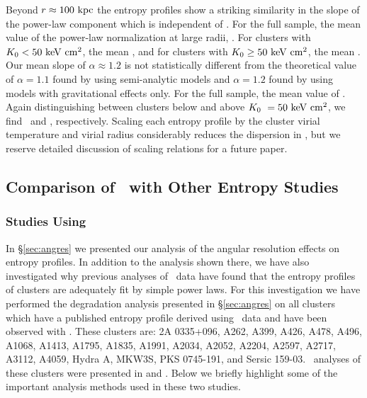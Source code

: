 \documentclass[12pt,preprint]{aastex}
\begin{document}
Beyond $r \approx 100 \mbox{\ensuremath{\mathrm{~kpc}}}$ the entropy profiles show a striking
similarity in the slope of the power-law component which is
independent of \kna. For the full sample, the mean value of the
power-law normalization at large radii, \alphafs. For clusters with
$K_0 < 50 \mathrm{\mbox{\ensuremath{\mathrm{~keV}}} \mathrm{\mbox{\ensuremath{\mathrm{~cm}}}^2}}$, the mean \alphaga, and for clusters with $K_0 \geq
50 \mathrm{\mbox{\ensuremath{\mathrm{~keV}}} \mathrm{\mbox{\ensuremath{\mathrm{~cm}}}^2}}$, the mean \alphagb. Our mean slope of $\alpha \approx 1.2$ is
not statistically different from the theoretical value of $\alpha =
1.1$ found by \citet{tozzi01} using semi-analytic models and $\alpha =
1.2$ found by \citet{vkb05} using models with gravitational effects
only. For the full sample, the mean value of \khunfs. Again
distinguishing between clusters below and above $K_0\ = 50 \mathrm{\mbox{\ensuremath{\mathrm{~keV}}} \mathrm{\mbox{\ensuremath{\mathrm{~cm}}}^2}}$, we
find \khunga\ and \khungb, respectively. Scaling each entropy profile
by the cluster virial temperature and virial radius considerably
reduces the dispersion in \khun, but we reserve detailed discussion of
scaling relations for a future paper.

\subsection{Comparison of \accept\ with Other Entropy Studies}
\label{sec:comp}

\subsubsection{Studies Using \xmm}

In \S \ref{sec:angres} we presented our analysis of the angular
resolution effects on entropy profiles. In addition to the analysis
shown there, we have also investigated why previous analyses of
\xmm\ data have found that the entropy profiles of clusters are
adequately fit by simple power laws. For this investigation we have
performed the degradation analysis presented in \S \ref{sec:angres} on
all clusters which have a published entropy profile derived using
\xmm\ data and have been observed with \chandra. These clusters are:
2A 0335+096, A262, A399, A426, A478, A496, A1068, A1413, A1795, A1835,
A1991, A2034, A2052, A2204, A2597, A2717, A3112, A4059, Hydra A,
MKW3S, PKS 0745-191, and Sersic 159-03. \xmm\ analyses of these
clusters were presented in \citet{piffaretti05} and
\citet{pratt06}. Below we briefly highlight some of the important
analysis methods used in these two studies.
\end{document}
